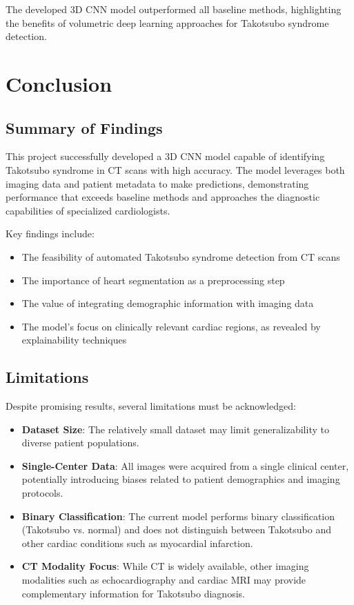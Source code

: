 \documentclass[12pt, BSc]{muthesis}
\begin{document}
The developed 3D CNN model outperformed all baseline methods, highlighting the benefits of volumetric deep learning approaches for Takotsubo syndrome detection.


\chapter{Conclusion}
\section{Summary of Findings}
This project successfully developed a 3D CNN model capable of identifying Takotsubo syndrome in CT scans with high accuracy. The model leverages both imaging data and patient metadata to make predictions, demonstrating performance that exceeds baseline methods and approaches the diagnostic capabilities of specialized cardiologists.

Key findings include:
\begin{itemize}
    \item The feasibility of automated Takotsubo syndrome detection from CT scans
    \item The importance of heart segmentation as a preprocessing step
    \item The value of integrating demographic information with imaging data
    \item The model's focus on clinically relevant cardiac regions, as revealed by explainability techniques
\end{itemize}

\section{Limitations}
Despite promising results, several limitations must be acknowledged:
\begin{itemize}
    \item \textbf{Dataset Size}: The relatively small dataset may limit generalizability to diverse patient populations.
    \item \textbf{Single-Center Data}: All images were acquired from a single clinical center, potentially introducing biases related to patient demographics and imaging protocols.
    \item \textbf{Binary Classification}: The current model performs binary classification (Takotsubo vs. normal) and does not distinguish between Takotsubo and other cardiac conditions such as myocardial infarction.
    \item \textbf{CT Modality Focus}: While CT is widely available, other imaging modalities such as echocardiography and cardiac MRI may provide complementary information for Takotsubo diagnosis.
\end{itemize}
\end{document}
